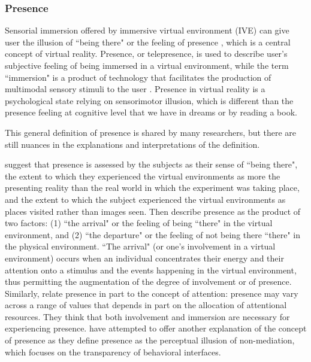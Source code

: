 \subsubsection{Presence}
Sensorial immersion offered by immersive virtual environment (IVE) can give user the illusion of ``being there" or the feeling of presence \citep{Heeter1992Presence}, which is a central concept of virtual reality. Presence, or telepresence, is used to describe user's subjective feeling of being immersed in a virtual environment, while the term ``immersion" is a product of technology that facilitates the production of multimodal sensory stimuli to the user \citep{Slater1994DepthPre, Bystrom1999Model}. Presence in virtual reality is a psychological state relying on sensorimotor illusion, which is different than the presence feeling at cognitive level that we have in dreams or by reading a book.

This general definition of presence is shared by many researchers, but there are still nuances in the explanations and interpretations of the definition.

\citet{Slater1994DepthPre} suggest that presence is assessed by the subjects as their sense of ``being there", the extent to which they experienced the virtual environments as more the presenting reality than the real world in which the experiment was taking place, and the extent to which the subject experienced the virtual environments as places visited rather than images seen. Then \citet{Kim1997Telepresence} describe presence as the product of two factors: (1) ``the arrival" or the feeling of being ``there" in the virtual environment, and (2) ``the departure" or the feeling of not being there ``there" in the physical environment. ``The arrival" (or one's involvement in a virtual environment) occurs when an individual concentrates their energy and their attention onto a stimulus and the events happening in the virtual environment, thus permitting the augmentation of the degree of involvement or of presence. Similarly, \citet{Witmer1998MPV} relate presence in part to the concept of attention: presence may vary across a range of values that depends in part on the allocation of attentional resources. They think that both involvement and immersion are necessary for experiencing presence. \citet{Lombard1997Heart} have attempted to offer another explanation of the concept of presence as they define presence as the perceptual illusion of non-mediation, which focuses on the transparency of behavioral interfaces.

